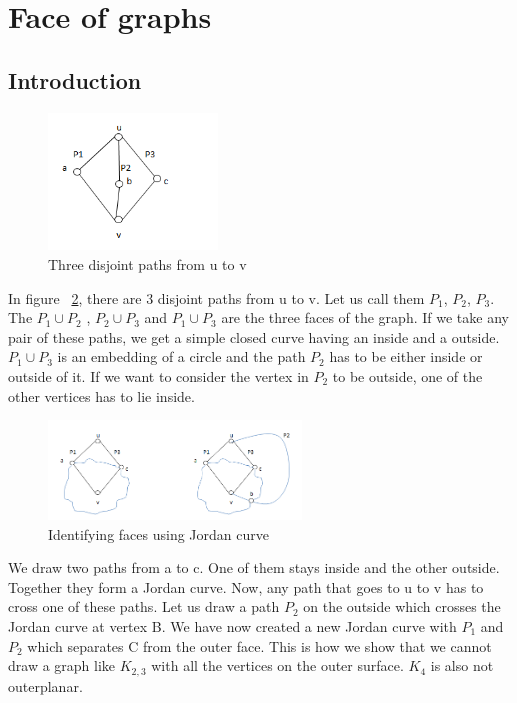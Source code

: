 \documentclass{article}
\begin{document}
\section{Face of graphs}
\subsection{Introduction}
\begin{figure}[h]
    \centering
    \includegraphics[width=0.4\textwidth]{images/Path_Image.PNG}
    \caption{Three disjoint paths from u to v}
    \label{fig:Path_Image}
\end{figure}

In figure ~\ref{fig:Path_Image}, there are 3 disjoint paths from u to v. Let us call them $P_1$, $P_2$, $P_3$. The $P_1 \cup P_2$ , $P_2 \cup P_3$ and $P_1 \cup P_3$ are the three faces of the graph. If we take any pair of these paths, we get a simple closed curve having an inside and a outside. $P_1 \cup P_3$ is an embedding of a circle and the path $P_2$ has to be either inside or outside of it. If we want to consider the vertex in $P_2$ to be outside, one of the other vertices has to lie inside.

\begin{figure}[h]
    \centering
    \includegraphics[width=0.6\textwidth]{images/Image_Proof.PNG}
    \caption{Identifying faces using Jordan curve}
    \label{fig:Path_Image}
\end{figure}

We draw two paths from a to c. One of them stays inside and the other outside. 
Together they form a Jordan curve.
Now, any path that goes to u to v has to cross one of these paths. 
Let us draw a path $P_2$ on the outside which crosses the Jordan curve at vertex B. 
We have now created a new Jordan curve with $P_1$ and $P_2$ which separates C from the
outer face. This is how we show that we cannot draw a graph like $K_{2,3}$ with all the vertices on the outer surface.
$K_4$ is also not outerplanar.
\end{document}
